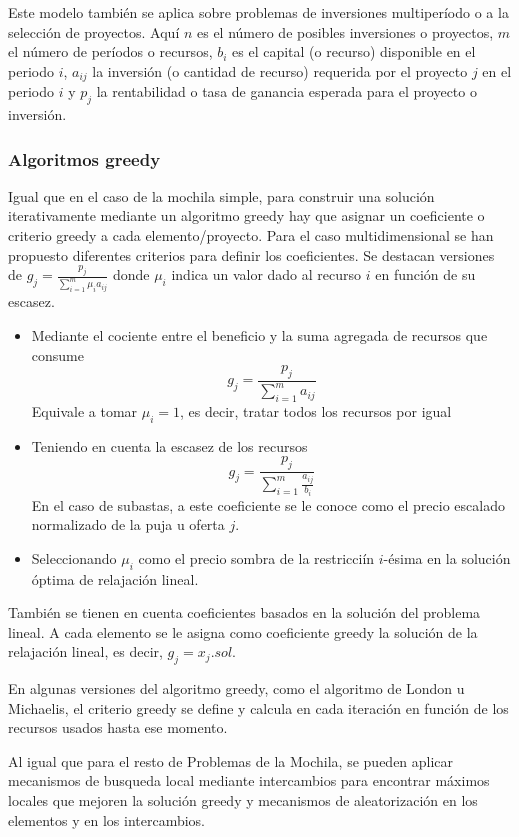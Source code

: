 Este modelo también se aplica sobre problemas de inversiones multiperíodo o a la selección de proyectos. Aquí $n$ es el 
número de posibles inversiones o proyectos, $m$ el número de períodos o recursos, $b_i$ es el capital (o recurso) disponible
en el periodo $i$, $a_{ij}$ la inversión (o cantidad de recurso) requerida por el proyecto $j$ en el periodo $i$ y $p_j$ la
rentabilidad o tasa de ganancia esperada para el proyecto o inversión.

\subsubsection{Algoritmos greedy}

Igual que en el caso de la mochila simple, para construir una solución iterativamente mediante un algoritmo greedy hay que
asignar un coeficiente o criterio greedy a cada elemento/proyecto. Para el caso multidimensional se han propuesto diferentes
criterios para definir los coeficientes. Se destacan versiones de $g_j=\frac{p_j}{\sum_{i=1}^m \mu_ia_{ij}}$ donde $\mu_i$ 
indica un valor dado al recurso $i$ en función de su escasez.

\begin{itemize}
    \item Mediante el cociente entre el beneficio y la suma agregada de recursos que consume
    \[
        g_j=\frac{p_j}{\sum_{i=1}^m a_{ij}}
    \]
    Equivale a tomar $\mu_i=1$, es decir, tratar todos los recursos por igual
    \item Teniendo en cuenta la escasez de los recursos
    \[
        g_j=\frac{p_j}{\sum_{i=1}^m \frac{a_{ij}}{b_i}}
    \]
    En el caso de subastas, a este coeficiente se le conoce como el precio escalado normalizado de la puja u oferta $j$.
    \item Seleccionando $\mu_i$ como el precio sombra de la restricciín $i$-ésima en la solución óptima de relajación lineal.
\end{itemize}

\noindent También se tienen en cuenta coeficientes basados en la solución del problema lineal. A cada elemento se le asigna
como coeficiente greedy la solución de la relajación lineal, es decir, $g_j=x_{j}.sol$.

\newpage

\noindent En algunas versiones del algoritmo greedy, como el algoritmo de London u Michaelis, el criterio greedy se define y 
calcula en cada iteración en función de los recursos usados hasta ese momento.

\vspace*{5mm}

Al igual que para el resto de Problemas de la Mochila, se pueden aplicar mecanismos de busqueda local mediante intercambios
para encontrar máximos locales que mejoren la solución greedy y mecanismos de aleatorización en los elementos y en los 
intercambios.